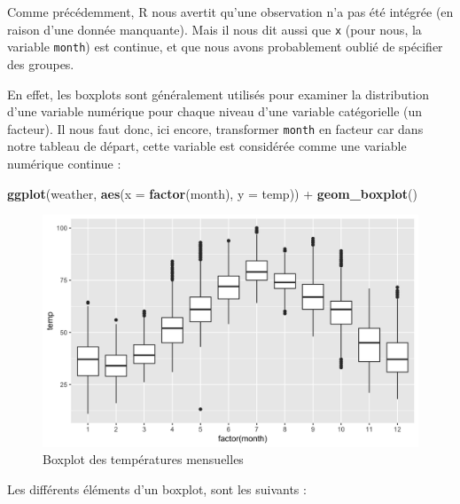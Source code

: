\documentclass[a4paperpaper,]{article}
\newenvironment{Shaded}{\begin{snugshade}}{\end{snugshade}}
\newcommand{\DataTypeTok}[1]{\textcolor[rgb]{0.00,0.34,0.68}{#1}}
\newcommand{\KeywordTok}[1]{\textcolor[rgb]{0.12,0.11,0.11}{\textbf{#1}}}
\newcommand{\NormalTok}[1]{\textcolor[rgb]{0.12,0.11,0.11}{#1}}
\newcommand{\OperatorTok}[1]{\textcolor[rgb]{0.12,0.11,0.11}{#1}}
\newcommand{\StringTok}[1]{\textcolor[rgb]{0.75,0.01,0.01}{#1}}
\theoremstyle{definition}
\theoremstyle{definition}
\theoremstyle{definition}
\theoremstyle{remark}
\begin{document}
Comme précédemment, R nous avertit qu'une observation n'a pas été
intégrée (en raison d'une donnée manquante). Mais il nous dit aussi que
\texttt{x} (pour nous, la variable \texttt{month}) est continue, et que
nous avons probablement oublié de spécifier des groupes.

En effet, les boxplots sont généralement utilisés pour examiner la
distribution d'une variable numérique pour chaque niveau d'une variable
catégorielle (un facteur). Il nous faut donc, ici encore, transformer
\texttt{month} en facteur car dans notre tableau de départ, cette
variable est considérée comme une variable numérique continue :

\begin{Shaded}
\begin{Highlighting}[]
\KeywordTok{ggplot}\NormalTok{(weather, }\KeywordTok{aes}\NormalTok{(}\DataTypeTok{x =} \KeywordTok{factor}\NormalTok{(month), }\DataTypeTok{y =}\NormalTok{ temp)) }\OperatorTok{+}
\StringTok{  }\KeywordTok{geom_boxplot}\NormalTok{()}
\end{Highlighting}
\end{Shaded}

\begin{figure}[htpb]

{\centering \includegraphics[width=0.9\linewidth]{figure/unnamed-chunk-56-1} 

}

\caption{Boxplot des températures mensuelles}\label{fig:unnamed-chunk-56}
\end{figure}

Les différents éléments d'un boxplot, sont les suivants :
\end{document}
